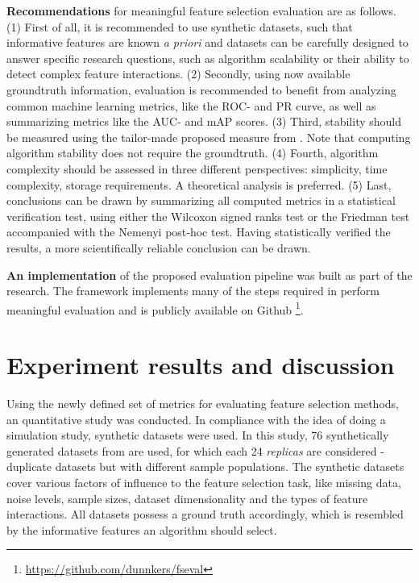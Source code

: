 \documentclass{article}
\begin{document}
\textbf{Recommendations} for meaningful feature selection evaluation are as follows. (1) First of all, it is recommended to use synthetic datasets, such that informative features are known \textit{a priori} and datasets can be carefully designed to answer specific research questions, such as algorithm scalability or their ability to detect complex feature interactions. (2) Secondly, using now available groundtruth information, evaluation is recommended to benefit from analyzing common machine learning metrics, like the ROC- and PR curve, as well as summarizing metrics like the AUC- and mAP scores. (3) Third, stability should be measured using the tailor-made proposed measure from \citep{nogueira2017stability}. Note that computing algorithm stability does not require the groundtruth. (4) Fourth, algorithm complexity should be assessed in three different perspectives: simplicity, time complexity, storage requirements. A theoretical analysis is preferred. (5) Last, conclusions can be drawn by summarizing all computed metrics in a statistical verification test, using either the Wilcoxon signed ranks test or the Friedman test accompanied with the Nemenyi post-hoc test. Having statistically verified the results, a more scientifically reliable conclusion can be drawn.

\textbf{An implementation} of the proposed evaluation pipeline was built as part of the research. The framework implements many of the steps required in perform meaningful evaluation and is publicly available on Github \footnote{\url{https://github.com/dunnkers/fseval}}.

\section{Experiment results and discussion}\label{sec:experiment}
Using the newly defined set of metrics for evaluating feature selection methods, an quantitative study was conducted. In compliance with the idea of doing a simulation study, synthetic datasets were used. In this study, 76 synthetically generated datasets from \citep{urbanowicz2018benchmarking} are used, for which each 24 \textit{replicas} are considered - duplicate datasets but with different sample populations. The synthetic datasets cover various factors of influence to the feature selection task, like missing data, noise levels, sample sizes, dataset dimensionality and the types of feature interactions. All datasets possess a ground truth accordingly, which is resembled by the informative features an algorithm should select.
\end{document}
